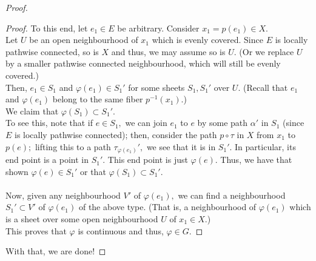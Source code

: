 \documentclass[12pt]{article}
\theoremstyle{definition}
\numberwithin{thm}{section}
\newenvironment{blockquote}
{\begin{mdframed}[skipabove=0pt, skipbelow=0pt, innertopmargin=4pt, innerbottommargin=4pt, bottomline=false,topline=false,rightline=false, linewidth=2pt]}
{\end{mdframed}}
\begin{document}
\begin{proof}
\begin{blockquote}
\begin{proof}
			To this end, let $e_1 \in E$ be arbitrary. Consider $x_1 = p(e_1) \in X.$\\
			Let $U$ be an open neighbourhood of $x_1$ which is evenly covered. Since $E$ is locally pathwise connected, so is $X$ and thus, we may assume so is $U.$ (Or we replace $U$ by a smaller pathwise connected neighbourhood, which will still be evenly covered.)\\
			Then, $e_1 \in S_1$ and $\varphi(e_1) \in S_1'$ for some sheets $S_1, S_1'$ over $U.$ (Recall that $e_1$ and $\varphi(e_1)$ belong to the same fiber $p^{-1}(x_1).$) \\
			We claim that $\varphi(S_1) \subset S_1'.$ \\
			To see this, note that if $e \in S_1,$ we can join $e_1$ to $e$ by some path $\alpha'$ in $S_1$ (since $E$ is locally pathwise connected); then, consider the path $p\circ \tau$ in $X$ from $x_1$ to $p(e);$ lifting this to a path $\tau_{\varphi(e_1)}',$ we see that it is in $S_1'.$ In particular, its end point is a point in $S_1'.$ This end point is just $\varphi(e).$ Thus, we have that shown $\varphi(e) \in S_1'$ or that $\varphi(S_1) \subset S_1'.$\\~\\
			Now, given any neighbourhood $V'$ of $\varphi(e_1),$ we can find a neighbourhood $S_1' \subset V'$ of $\varphi(e_1)$ of the above type. (That is, a neighbourhood of $\varphi(e_1)$ which is a sheet over some open neighbourhood $U$ of $x_1 \in X.$)\\
			This proves that $\varphi$ is continuous and thus, $\varphi \in G.$
		\end{proof}
	\end{blockquote}
	With that, we are done!
\end{proof}
\end{document}
